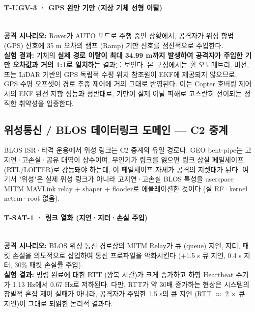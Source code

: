 \paragraph{\textbf{T-UGV-3 · GPS 완만 기만 (지상 기체 선형 이탈)}} ~\\
\textbf{공격 시나리오:} Rover가 AUTO 모드로 주행 중인 상황에서, 공격자가 위성 항법 (GPS) 신호에 35 m 오차의 램프 (Ramp) 기만 신호를 점진적으로 주입한다.\\
\textbf{실험 결과:} 기체의 \textbf{실제 경로 이탈이 최대 34.99 m까지 발생하여 공격자가 주입한 기만 오차값과 거의 1:1로 일치}하는 결과를 보인다. 본 구성에서는 휠 오도메트리, 비전, 또는 LiDAR 기반의 GPS 독립적 수평 위치 참조원이 EKF에 제공되지 않으므로, GPS 수평 오프셋이 경로 추종 제어에 거의 그대로 반영된다. 이는 Copter 호버링 제어 시의 EKF 완전 저항 성능과 정반대로, 기만이 실제 이탈 피해로 고스란히 전이되는 정직한 취약성을 입증한다.
\subsection{위성통신 / BLOS 데이터링크 도메인 --- C2 중계}

BLOS ISR·타격 운용에서 위성 링크는 C2 중계의 유일 경로다. GEO bent-pipe는 고지연·고손실·공유 대역이 상수이며, 무인기가 링크를 잃으면 링크 상실 페일세이프 (RTL/LOITER)로 강등돼야 하는데, 이 페일세이프 자체가 공격의 지렛대가 된다. 여기서 "위성"은 실제 위성 링크가 아니라 고지연·고손실 BLOS 특성을 userspace MITM MAVLink relay + shaper + flooder로 에뮬레이션한 것이다 (실 RF·kernel netem·root 없음).

\paragraph{\textbf{T-SAT-1 · 링크 열화 (지연·지터·손실 주입)}} ~\\
\textbf{공격 시나리오:} BLOS 위성 통신 경로상의 MITM Relay가 큐 (queue) 지연, 지터, 패킷 손실을 의도적으로 삽입하여 통신 프로파일을 악화시킨다 (+1.5 s 큐 지연, 0.4 s 지터, 30\% 패킷 손실률 주입).\\
\textbf{실험 결과:} 명령 완료에 대한 RTT (왕복 시간)가 크게 증가하고 하향 Heartbeat 주기가 1.13 Hz에서 0.67 Hz로 저하된다. 다만, RTT가 약 30배 증가하는 현상은 시스템의 창발적 혼잡 제어 실패가 아니라, 공격자가 주입한 1.5 s의 큐 지연 (RTT $\approx$ 2 $\times$ 큐 지연)이 그대로 되읽힌 논리적 결과다.

